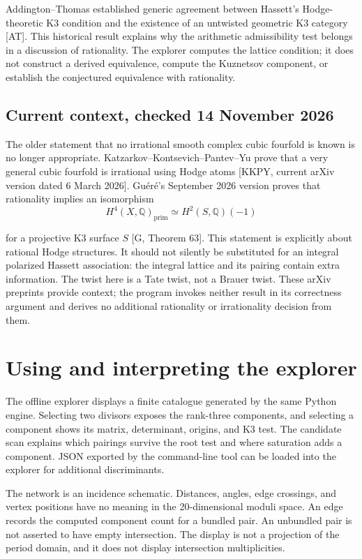 \documentclass[
  american,
  11pt,
  a4paper,
]{article}
\begin{document}
Addington--Thomas established generic agreement between Hassett's
Hodge-theoretic K3 condition and the existence of an untwisted geometric
K3 category {[}AT{]}. This historical result explains why the arithmetic
admissibility test belongs in a discussion of rationality. The explorer
computes the lattice condition; it does not construct a derived
equivalence, compute the Kuznetsov component, or establish the
conjectured equivalence with rationality.

\subsection{Current context, checked 14 November
2026}\label{current-context-checked-14-november-2026}

The older statement that no irrational smooth complex cubic fourfold is
known is no longer appropriate. Katzarkov--Kontsevich--Pantev--Yu prove
that a very general cubic fourfold is irrational using Hodge atoms
{[}KKPY, current arXiv version dated 6 March 2026{]}. Guéré's September
2026 version proves that rationality implies an isomorphism
\[H^4(X,\mathbb Q)_{\mathrm{prim}}\simeq H^2(S,\mathbb Q)(-1)\]

for a projective K3 surface \(S\) {[}G, Theorem 63{]}. This statement is
explicitly about rational Hodge structures. It should not silently be
substituted for an integral polarized Hassett association: the integral
lattice and its pairing contain extra information. The twist here is a
Tate twist, not a Brauer twist. These arXiv preprints provide context;
the program invokes neither result in its correctness argument and
derives no additional rationality or irrationality decision from them.

\section{Using and interpreting the
explorer}\label{using-and-interpreting-the-explorer}

The offline explorer displays a finite catalogue generated by the same
Python engine. Selecting two divisors exposes the rank-three components,
and selecting a component shows its matrix, determinant, origins, and K3
test. The candidate scan explains which pairings survive the root test
and where saturation adds a component. JSON exported by the command-line
tool can be loaded into the explorer for additional discriminants.

The network is an incidence schematic. Distances, angles, edge
crossings, and vertex positions have no meaning in the 20-dimensional
moduli space. An edge records the computed component count for a bundled
pair. An unbundled pair is not asserted to have empty intersection. The
display is not a projection of the period domain, and it does not
display intersection multiplicities.
\end{document}
